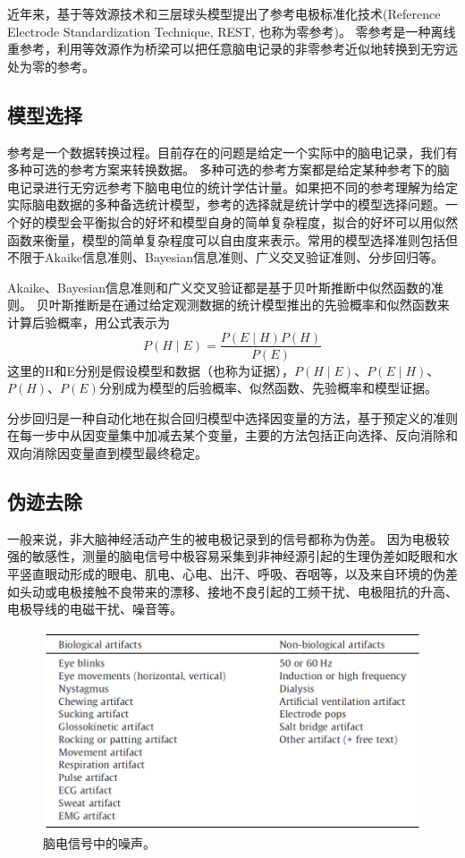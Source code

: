 近年来，\cite{yao_method_2001}基于等效源技术和三层球头模型提出了参考电极标准化技术(Reference Electrode Standardization Technique, REST, 也称为零参考)。 零参考是一种离线重参考，利用等效源作为桥梁可以把任意脑电记录的非零参考近似地转换到无穷远处为零的参考。

\subsection{模型选择}
参考是一个数据转换过程。目前存在的问题是给定一个实际中的脑电记录，我们有多种可选的参考方案来转换数据。 多种可选的参考方案都是给定某种参考下的脑电记录进行无穷远参考下脑电电位的统计学估计量。如果把不同的参考理解为给定实际脑电数据的多种备选统计模型，参考的选择就是统计学中的模型选择问题。一个好的模型会平衡拟合的好坏和模型自身的简单复杂程度，拟合的好坏可以用似然函数来衡量，模型的简单复杂程度可以自由度来表示。常用的模型选择准则包括但不限于Akaike信息准则、Bayesian信息准则、广义交叉验证准则、分步回归等。 

Akaike、Bayesian信息准则和广义交叉验证都是基于贝叶斯推断中似然函数的准则。 贝叶斯推断是在通过给定观测数据的统计模型推出的先验概率和似然函数来计算后验概率，用公式表示为
\[P(H\mid{E})=\frac{P(E\mid{H})P(H)}{P(E)}\]
这里的H和E分别是假设模型和数据（也称为证据），$P(H\mid{E})$、$P(E\mid{H})$、$P(H)$、$P(E)$分别成为模型的后验概率、似然函数、先验概率和模型证据。

分步回归是一种自动化地在拟合回归模型中选择因变量的方法，基于预定义的准则在每一步中从因变量集中加减去某个变量，主要的方法包括正向选择、反向消除和双向消除因变量直到模型最终稳定。

\subsection{伪迹去除}
一般来说，非大脑神经活动产生的被电极记录到的信号都称为伪差。 因为电极较强的敏感性，测量的脑电信号中极容易采集到非神经源引起的生理伪差如眨眼和水平竖直眼动形成的眼电、肌电、心电、出汗、呼吸、吞咽等，以及来自环境的伪差如头动或电极接触不良带来的漂移、接地不良引起的工频干扰、电极阻抗的升高、电极导线的电磁干扰、噪音等。
\begin{figure}
	\includegraphics[width=15cm]{pic/xulun/EEGnoise.png}
	\caption{脑电信号中的噪声。}
	\label{fig6}
\end{figure}


